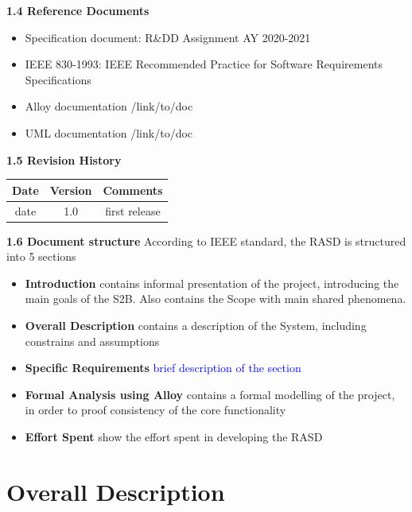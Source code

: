 \documentclass[a4paper, 10pt, oneside]{article}
\newcommand{\giovanni}[1]{\textcolor{Blue}{#1}}
\begin{document}
{\large \textbf{1.4 Reference Documents}}
\begin{itemize}
    \item Specification document: R\&DD Assignment AY 2020-2021
    \item IEEE 830-1993: IEEE Recommended Practice for Software Requirements Specifications
    \item Alloy documentation /link/to/doc
    \item UML documentation /link/to/doc
\end{itemize}
{\large \textbf{1.5 Revision History}}
\begin{center}
 \begin{tabular}{||c c c||}
 \hline
 Date & Version & Comments \\ [0.5ex] 
 \hline\hline
 date & 1.0 & first release \\ 
 \hline
 \hline
\end{tabular}
\end{center}
{\large \textbf{1.6 Document structure}} \newline
\newline
According to IEEE standard, the RASD is structured into 5 sections
\begin{itemize}
    \item \textbf{Introduction} contains informal presentation of the project, introducing the main goals of the S2B. Also contains the Scope with main shared phenomena.
    \item \textbf{Overall Description} contains a description of the System, including constrains and assumptions
    \item \textbf{Specific Requirements} \giovanni{brief description of the section}
    \item \textbf{Formal Analysis using Alloy} contains a formal modelling of the project, in order to proof consistency of the core functionality 
    \item \textbf{Effort Spent} show the effort spent in developing the RASD
\end{itemize}

\section{Overall Description}
\label{overallDescription}
\end{document}
